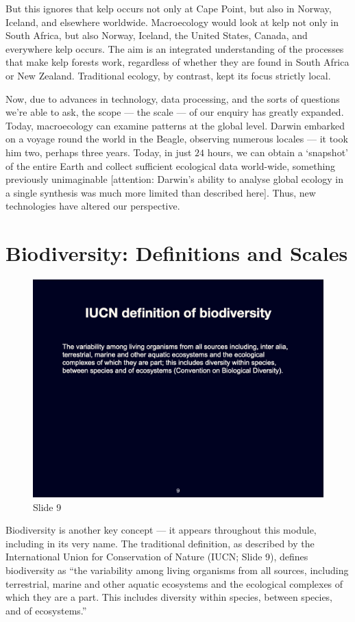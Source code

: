 \documentclass[
  11pt,
]{book}
\begin{document}
But this ignores that kelp occurs not only at Cape Point, but also in
Norway, Iceland, and elsewhere worldwide. Macroecology would look at
kelp not only in South Africa, but also Norway, Iceland, the United
States, Canada, and everywhere kelp occurs. The aim is an integrated
understanding of the processes that make kelp forests work, regardless
of whether they are found in South Africa or New Zealand. Traditional
ecology, by contrast, kept its focus strictly local.

Now, due to advances in technology, data processing, and the sorts of
questions we're able to ask, the scope --- the scale --- of our enquiry
has greatly expanded. Today, macroecology can examine patterns at the
global level. Darwin embarked on a voyage round the world in the Beagle,
observing numerous locales --- it took him two, perhaps three years.
Today, in just \(24\) hours, we can obtain a `snapshot' of the entire
Earth and collect sufficient ecological data world-wide, something
previously unimaginable {[}attention: Darwin's ability to analyse global
ecology in a single synthesis was much more limited than described
here{]}. Thus, new technologies have altered our perspective.

\section{Biodiversity: Definitions and
Scales}\label{biodiversity-definitions-and-scales}

\begin{figure}[ht]
\centering
\includegraphics[width=0.8\linewidth]{../images/BDC334/BDC334-009.jpeg}
\caption*{Slide 9}
\end{figure}

Biodiversity is another key concept --- it appears throughout this
module, including in its very name. The traditional definition, as
described by the International Union for Conservation of Nature (IUCN;
Slide 9), defines biodiversity as ``the variability among living
organisms from all sources, including terrestrial, marine and other
aquatic ecosystems and the ecological complexes of which they are a
part. This includes diversity within species, between species, and of
ecosystems.''
\end{document}
